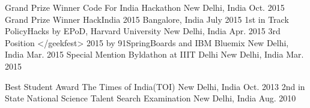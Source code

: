 \begin{cvhonors}
  \cvhonor
    {Grand Prize Winner}
    {Code For India Hackathon}
    {New Delhi, India}
    {Oct. 2015}
  \cvhonor
    {Grand Prize Winner}
    {HackIndia 2015}
    {Bangalore, India}
    {July 2015}
  \cvhonor
    {1st in Track}
    {PolicyHacks by EPoD, Harvard University}
    {New Delhi, India}
    {Apr. 2015}
  \cvhonor
    {3rd Position}
    {</geekfest> 2015 by 91SpringBoards and IBM Bluemix}
    {New Delhi, India}
    {Mar. 2015}
  \cvhonor
    {Special Mention}
    {Byldathon at IIIT Delhi}
    {New Delhi, India}
    {Mar. 2015}
\end{cvhonors}

\begin{cvhonors}
  \cvhonor
    {Best Student Award}
    {The Times of India(TOI)}
    {New Delhi, India}
    {Oct. 2013}
  \cvhonor
    {2nd in State}
    {National Science Talent Search Examination}
    {New Delhi, India}
    {Aug. 2010}
\end{cvhonors}
